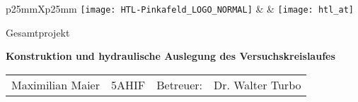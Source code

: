 
\begin{titlepage}



\begin{adjustwidth}{-1cm}{-1cm} %
\enlargethispage{10cm}
\vspace*{-3.5cm}
\begin{center}

\selectfont

\vspace*{10mm}

\begin{tabularx}{\linewidth}{p{25mm}Xp{25mm}}
\texttt{[image: HTL-Pinkafeld\_LOGO\_NORMAL]}
& 
&
\texttt{[image: htl\_at]}
\\ \hline
\end{tabularx}

\vspace*{30mm}

{\fontsize{24}{24}\selectfont
\bfseries\LDinsertworktitle}

\vspace*{20mm}

{\fontsize{12}{12}\selectfont
Gesamtprojekt}

{\fontsize{20}{22}\selectfont
\bfseries\LDinserttitle\par}

\end{center}

\vspace*{35mm}
{\selectfont

{\bfseries 
Konstruktion und hydraulische Auslegung des Versuchskreislaufes
}\\
\begin{tabularx}{\linewidth}{@{}p{4.5cm}p{3.5cm}p{2cm}X@{}}
Maximilian Maier & 5AHIF & Betreuer: & Dr. Walter Turbo\\
\end{tabularx}

}
\end{adjustwidth}
\end{titlepage}
